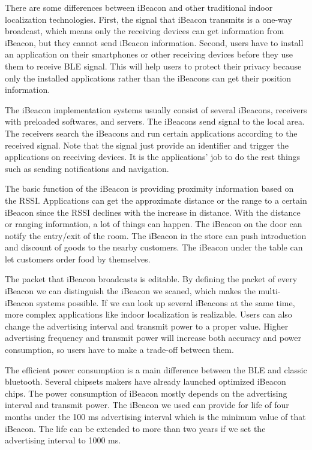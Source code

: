 \documentclass[12pt]{report}
\begin{document}
There are some differences between iBeacon and other traditional indoor localization technologies. First, the signal that iBeacon transmits is a one-way broadcast, which means only the receiving devices can get information from iBeacon, but they cannot send iBeacon information. Second, users have to install an application on their smartphones or other receiving devices before they use them to receive BLE signal. This will help users to protect their privacy because only the installed applications rather than the iBeacons can get their position information.

The iBeacon implementation systems usually consist of several iBeacons, receivers with preloaded softwares, and servers. The iBeacons send signal to the local area. The receivers search the iBeacons and run certain applications according to the received signal. Note that the signal just provide an identifier and trigger the applications on receiving devices. It is the applications' job to do the rest things such as sending notifications and navigation.

The basic function of the iBeacon is providing proximity information based on the RSSI. Applications can get the approximate distance or the range to a certain iBeacon since the RSSI declines with the increase in distance. With the distance or ranging information, a lot of things can happen. The iBeacon on the door can notify the entry/exit of the room. The iBeacon in the store can push introduction and discount of goods to the nearby customers. The iBeacon under the table can let customers order food by themselves. 

The packet that iBeacon broadcasts is editable. By defining the packet of every iBeacon we can distinguish the iBeacon we scaned, which makes the multi-iBeacon systems possible. If we can look up several iBeacons at the same time, more complex applications like indoor localization is realizable. Users can also change the advertising interval and transmit power to a proper value. Higher advertising frequency and transmit power will increase both accuracy and power consumption, so users have to make a trade-off between them.

The efficient power consumption is a main difference between the BLE and classic bluetooth. Several chipsets makers have already launched optimized iBeacon chips. The power consumption of iBeacon mostly depends on the advertising interval and transmit power. The iBeacon we used can provide for life of four months under the 100 ms advertising interval which is the minimum value of that iBeacon. The life can be extended to more than two years if we set the advertising interval to 1000 ms.
\end{document}
